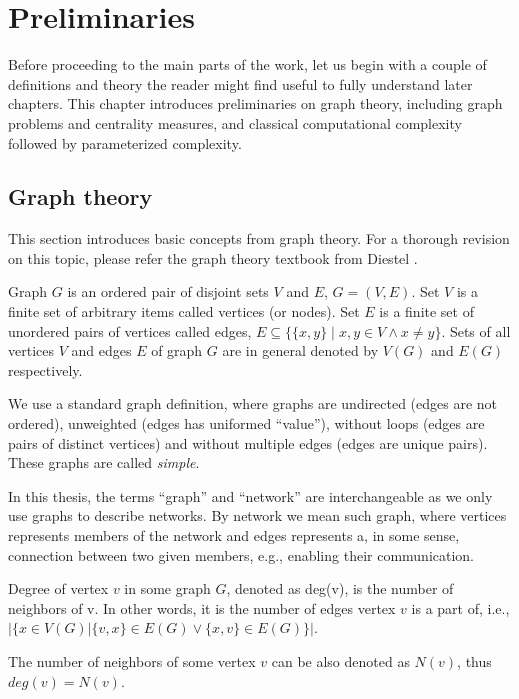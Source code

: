 \chapter{Preliminaries}

Before proceeding to the main parts of the work,
let us begin with a couple of definitions and theory the reader might find useful to fully understand later chapters.
This chapter introduces preliminaries on graph theory, including graph problems and centrality measures, and 
classical computational complexity followed by parameterized complexity.


\section{Graph theory}

This section introduces basic concepts from graph theory.
For a thorough revision on this topic, please refer the graph theory textbook from Diestel \cite{Diestel2018}.

\begin{definition}[Graph]
    Graph $G$ is an ordered pair of disjoint sets $V$ and $E$, $G=(V,E)$.
    Set $V$ is a finite set of arbitrary items called vertices (or nodes).
    Set $E$ is a finite set of unordered pairs of vertices called edges, $E \subseteq \{\{x,y\} \mid x,y \in V \wedge x \neq y\}$.
    Sets of all vertices $V$ and edges $E$ of graph $G$ are in general denoted by $V(G)$ and $E(G)$ respectively.
\end{definition}
We use a standard graph definition, where graphs are undirected (edges are not ordered),
unweighted (edges has uniformed ``value''), without loops (edges are pairs of distinct vertices) and
without multiple edges (edges are unique pairs).
These graphs are called \emph{simple}.

In this thesis, the terms ``graph'' and ``network'' are interchangeable as we only use graphs to describe networks.
By network we mean such graph, where vertices represents members of the network 
and edges represents a, in some sense, connection between two given members, e.g., enabling their communication.

\begin{definition}
    Degree of vertex $v$ in some graph $G$, denoted as deg(v), is the number of neighbors of v.
    In other words, it is the number of edges vertex $v$ is a part of, i.e.,
    $\Big|\{x \in V(G) \vert \{v,x\} \in E(G) \vee \{x,v\} \in E(G)\}\Big|$.
\end{definition}
The number of neighbors of some vertex $v$ can be also denoted as $N(v)$, thus $deg(v) = N(v)$.

